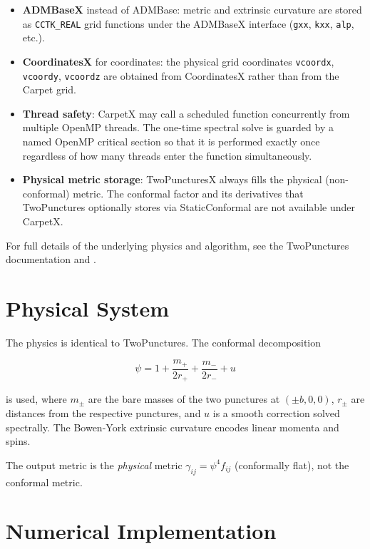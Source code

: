 \begin{itemize}
  \item \textbf{ADMBaseX} instead of ADMBase: metric and extrinsic curvature
    are stored as \texttt{CCTK\_REAL} grid functions under the ADMBaseX
    interface ({\tt gxx}, {\tt kxx}, {\tt alp}, etc.).
  \item \textbf{CoordinatesX} for coordinates: the physical grid coordinates
    \texttt{vcoordx}, \texttt{vcoordy}, \texttt{vcoordz} are obtained from
    CoordinatesX rather than from the Carpet grid.
  \item \textbf{Thread safety}: CarpetX may call a scheduled function
    concurrently from multiple OpenMP threads.  The one-time spectral solve is
    guarded by a named OpenMP critical section so that it is performed exactly
    once regardless of how many threads enter the function simultaneously.
  \item \textbf{Physical metric storage}: TwoPuncturesX always fills the
    physical (non-conformal) metric.  The conformal factor and its derivatives
    that TwoPunctures optionally stores via StaticConformal are not available
    under CarpetX.
\end{itemize}

For full details of the underlying physics and algorithm, see the TwoPunctures
documentation and \cite{einsteininitialdata_TwoPuncturesX_Ansorg04}.

\section{Physical System}

The physics is identical to TwoPunctures.  The conformal decomposition

\begin{equation}
  \psi = 1 + \frac{m_+}{2 r_+} + \frac{m_-}{2 r_-} + u
\end{equation}

is used, where $m_\pm$ are the bare masses of the two punctures at
$(\pm b, 0, 0)$, $r_\pm$ are distances from the respective punctures, and
$u$ is a smooth correction solved spectrally.  The Bowen-York extrinsic
curvature \cite{einsteininitialdata_TwoPuncturesX_BY80} encodes linear momenta
and spins.

The output metric is the \emph{physical} metric $\gamma_{ij} = \psi^4 f_{ij}$
(conformally flat), not the conformal metric.

\section{Numerical Implementation}

